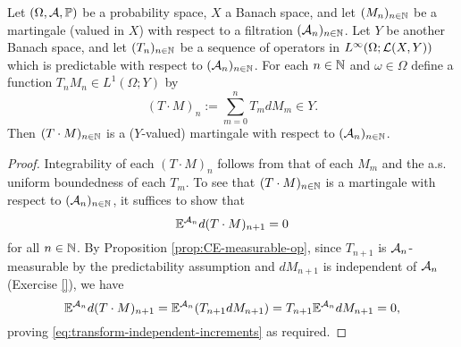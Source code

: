 \begin{prop}\label{prop:mgale-transforms}
  Let $(\Omega, \mathcal{A}, \mathbb{P})$ be a probability space, $X$ a Banach space, and let $(M_n)_{n \in \mathbb{N}}$ be a martingale (valued in $X$) with respect to a filtration $(\mathcal{A}_n)_{n \in \mathbb{N}}$.
  Let $Y$ be another Banach space, and let $(T_n)_{n \in \mathbb{N}}$ be a sequence of operators in $L^\infty(\Omega; \mathcal{L}(X,Y))$ which is predictable with respect to $(\mathcal{A}_n)_{n \in \mathbb{N}}$.
  For each $n \in \mathbb{N}$ and $\omega \in \Omega$ define a function $T_n M_n \in L^1(\Omega; Y)$ by
  \begin{equation*}
    (T \cdot M)_n := \sum_{m=0}^n T_m dM_m \in Y.
  \end{equation*}
  Then $(T \cdot M)_{n \in \mathbb{N}}$ is a ($Y$-valued) martingale with respect to $(\mathcal{A}_n)_{n \in \mathbb{N}}$.
\end{prop}

\begin{proof}
  Integrability of each $(T \cdot M)_n$ follows from that of each $M_m$ and the a.s. uniform boundedness of each $T_m$.
  To see that $(T \cdot M)_{n \in \mathbb{N}}$ is a martingale with respect to $(\mathcal{A}_n)_{n \in \mathbb{N}}$, it suffices to show that
  \begin{equation}\label{eq:transform-independent-increments}
    \mathbb{E}^{\mathcal{A}_n} d(T \cdot M)_{n+1} = 0
  \end{equation}
  for all $n \in \mathbb{N}$.
  By Proposition \ref{prop:CE-measurable-op}, since $T_{n+1}$ is $\mathcal{A}_n$-measurable by the predictability assumption and $dM_{n+1}$ is independent of $\mathcal{A}_n$ (Exercise \ref{}), we have %
  \begin{equation*}
    \mathbb{E}^{\mathcal{A}_n} d(T \cdot M)_{n+1} = \mathbb{E}^{\mathcal{A}_n} (T_{n+1} dM_{n+1}) = T_{n+1} \mathbb{E}^{\mathcal{A}_n} dM_{n+1} = 0,
  \end{equation*}
  proving \eqref{eq:transform-independent-increments} as required.
\end{proof}

